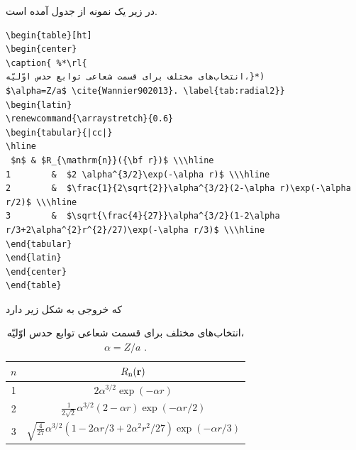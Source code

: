 در زیر یک نمونه از جدول آمده است.
\begin{latin}
 \begin{lstlisting}[style=Tex]
 \begin{table}[ht]
\begin{center}
\caption{ %*\rl{
انتخاب‌های مختلف برای قسمت شعاعی توابع حدس اوّلیّه،}*)
$\alpha=Z/a$ \cite{Wannier902013}. \label{tab:radial2}}
\begin{latin}
\renewcommand{\arraystretch}{0.6}
\begin{tabular}{|cc|}
\hline
 $n$ & $R_{\mathrm{n}}({\bf r})$ \\\hline
1        &  $2 \alpha^{3/2}\exp(-\alpha r)$ \\\hline
2        &  $\frac{1}{2\sqrt{2}}\alpha^{3/2}(2-\alpha r)\exp(-\alpha r/2)$ \\\hline
3        &  $\sqrt{\frac{4}{27}}\alpha^{3/2}(1-2\alpha r/3+2\alpha^{2}r^{2}/27)\exp(-\alpha r/3)$ \\\hline
\end{tabular}
\end{latin}
\end{center}
\end{table}  
 \end{lstlisting}

\end{latin}
که خروجی به شکل زیر دارد
\begin{table}[ht]
\begin{center}
\caption{ 
انتخاب‌های مختلف برای قسمت شعاعی توابع حدس اوّلیّه،
$\alpha=Z/a$ \cite{Wannier902013}. \label{tab:radial2}}
\begin{latin}
\renewcommand{\arraystretch}{0.6}
\begin{tabular}{|cc|}
\hline
 $n$ & $R_{\mathrm{n}}({\bf r})$ \\\hline
1        &  $2 \alpha^{3/2}\exp(-\alpha r)$ \\\hline
2        &  $\frac{1}{2\sqrt{2}}\alpha^{3/2}(2-\alpha r)\exp(-\alpha r/2)$ \\\hline
3        &  $\sqrt{\frac{4}{27}}\alpha^{3/2}(1-2\alpha r/3+2\alpha^{2}r^{2}/27)\exp(-\alpha r/3)$ \\\hline
\end{tabular}
\end{latin}
\end{center}
\end{table}

